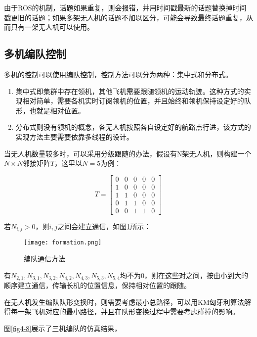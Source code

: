 由于ROS的机制，话题如果重复，则会报错，并用时间戳最新的话题替换掉时间戳更旧的话题；如果多架无人机的话题不加以区分，可能会导致最终话题重复，从而只有一架无人机可以使用。


\subsection{多机编队控制} \label{4.3.2}

多机的控制可以使用编队控制，控制方法可以分为两种：集中式和分布式。

\begin{enumerate}
	\item 集中式即集群中存在领机，其他飞机需要跟随领机的运动轨迹。这种方式的实现相对简单，需要各机实时订阅领机的位置，并且始终和领机保持设定好的队形，也就是相对位置。
	\item 分布式则没有领机的概念，各无人机按照各自设定好的航路点行进，该方式的实现方法主要需要依靠多线程的设计。
\end{enumerate}

当无人机数量较多时，可以采用分级跟随的办法，假设有N架无人机，则构建一个$N \times N$邻接矩阵$T$，这里以$N=5$为例：

$$
T=\begin{bmatrix}
0 & 0 & 0 & 0 & 0\\
1 & 0 & 0 & 0 & 0\\
1 & 1 & 0 & 0 & 0\\
0 & 1 & 1 & 0 & 0\\
0 & 0 & 1 & 1 & 0
\end{bmatrix}
$$

若$N_{i,j}>0$，则$i,j$之间会建立通信，如图\ref{fig4-7}所示：

\begin{figure}[!ht]
	\centering
	\texttt{[image: formation.png]}
	\caption{编队通信方法}
	\label{fig4-7}
\end{figure}

有$N_{2,1},N_{3,1},N_{3,2},N_{4,2},N_{4,3},N_{5,3},N_{5,4}$均不为0，则在这些对之间，按由小到大的顺序建立通信，传输长机的位置信息，保持相对位置的跟随。

在无人机发生编队队形变换时，则需要考虑最小总路径，可以用KM匈牙利算法解得每一架飞机对应的最小路径，并且在队形变换过程中需要考虑碰撞的影响\cite{XiaoKun}。

图\ref{fig4-8}展示了三机编队的仿真结果，



